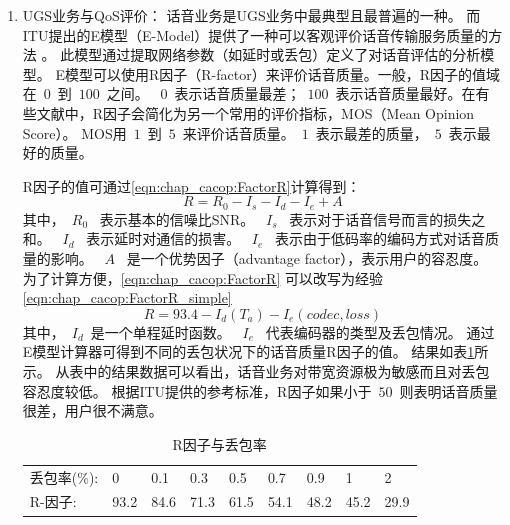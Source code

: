 \begin{enumerate}[(1)]
    \item UGS业务与QoS评价：
        话音业务是UGS业务中最典型且最普遍的一种。
        而ITU提出的E模型（E-Model）提供了一种可以客观评价话音传输服务质量的方法 \cite{ITU:G107}。
        此模型通过提取网络参数（如延时或丢包）定义了对话音评估的分析模型。
        E模型可以使用R因子（R-factor）来评价话音质量。一般，R因子的值域在~$0$~到~$100$~之间。
        ~$0$~表示话音质量最差；~$100$~表示话音质量最好。在有些文献中，R因子会简化为另一个常用的评价指标，MOS（Mean Opinion Score）。
        MOS用~$1$~到~$5$~来评价话音质量。~$1$~表示最差的质量，~$5$~表示最好的质量\cite{NK:IEICE:2005}。

        R因子的值可通过\eqref{eqn:chap_cacop:FactorR}计算得到：
\begin{equation}
\label{eqn:chap_cacop:FactorR}
R = R_0 − I_s − I_d − I_e + A 
\end{equation}
其中，~$R_0$~ 表示基本的信噪比SNR。
~$I_s$~ 表示对于话音信号而言的损失之和。
~$I_d$~ 表示延时对通信的损害。
~$I_e$~ 表示由于低码率的编码方式对话音质量的影响。
~$A$~ 是一个优势因子（advantage factor），表示用户的容忍度。
为了计算方便，\eqref{eqn:chap_cacop:FactorR} 可以改写为经验\eqref{eqn:chap_cacop:FactorR_simple}
\begin{equation}
R = 93. 4 - I_d ( T_a ) -I_e ( codec, loss )
\label{eqn:chap_cacop:FactorR_simple}
\end{equation}
其中，~$I_d$~是一个单程延时函数。
~$I_e$~ 代表编码器的类型及丢包情况。
通过E模型计算器可得到不同的丢包状况下的话音质量R因子的值\cite{ITU:EModel:Caculator}。 
结果如表\ref{tb:R_factor}所示。
从表中的结果数据可以看出，话音业务对带宽资源极为敏感而且对丢包容忍度较低。
根据ITU提供的参考标准，R因子如果小于~$50$~则表明话音质量很差，用户很不满意。

\begin{table}[tb]
\setlength{\abovecaptionskip}{2pt}
\setlength{\belowcaptionskip}{8pt}
\caption{R因子与丢包率} \label{tb:R_factor}
\begin{center}
\wuhao
\begin{tabularx}{0.99\textwidth}{lXXXXXXXX}
\toprule 
丢包率(\%): & 0& 0.1& 0.3& 0.5& 0.7& 0.9& 1& 2\\
R-因子: &93.2& 84.6& 71.3& 61.5& 54.1& 48.2& 45.2& 29.9\\ 
\bottomrule
\end{tabularx}
\end{center}
\end{table}


\end{enumerate}
